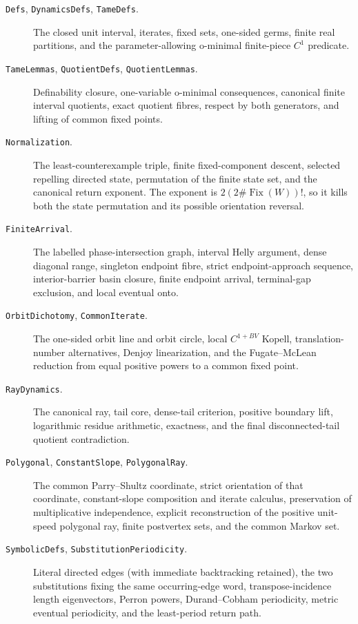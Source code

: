 \documentclass[11pt]{article}
\theoremstyle{definition}
\theoremstyle{remark}
\newcommand{\Fix}{\operatorname{Fix}}
\begin{document}
\begin{description}
\item[\texttt{Defs}, \texttt{DynamicsDefs}, \texttt{TameDefs}.]
The closed unit interval, iterates, fixed sets, one-sided germs, finite real
partitions, and the parameter-allowing o-minimal finite-piece \(C^1\)
predicate.

\item[\texttt{TameLemmas}, \texttt{QuotientDefs},
\texttt{QuotientLemmas}.]
Definability closure, one-variable o-minimal consequences, canonical finite
interval quotients, exact quotient fibres, respect by both generators, and
lifting of common fixed points.

\item[\texttt{Normalization}.]
The least-counterexample triple, finite fixed-component descent, selected
repelling directed state, permutation of the finite state set, and the
canonical return exponent.  The exponent is
\(2(2\#\Fix(W))!\), so it kills both the state permutation and its possible
orientation reversal.

\item[\texttt{FiniteArrival}.]
The labelled phase-intersection graph, interval Helly argument, dense
diagonal range, singleton endpoint fibre, strict endpoint-approach sequence,
interior-barrier basin closure, finite endpoint arrival, terminal-gap
exclusion, and local eventual onto.

\item[\texttt{OrbitDichotomy}, \texttt{CommonIterate}.]
The one-sided orbit line and orbit circle, local \(C^{1+BV}\) Kopell,
translation-number alternatives, Denjoy linearization, and the
Fugate--McLean reduction from equal positive powers to a common fixed point.

\item[\texttt{RayDynamics}.]
The canonical ray, tail core, dense-tail criterion, positive boundary lift,
logarithmic residue arithmetic, exactness, and the final disconnected-tail
quotient contradiction.

\item[\texttt{Polygonal}, \texttt{ConstantSlope},
\texttt{PolygonalRay}.]
The common Parry--Shultz coordinate, strict orientation of that coordinate,
constant-slope composition and iterate calculus, preservation of
multiplicative independence, explicit reconstruction of the positive
unit-speed polygonal ray, finite postvertex sets, and the common Markov set.

\item[\texttt{SymbolicDefs}, \texttt{SubstitutionPeriodicity}.]
Literal directed edges (with immediate backtracking retained), the two
substitutions fixing the same occurring-edge word, transpose-incidence length
eigenvectors, Perron powers, Durand--Cobham periodicity, metric eventual
periodicity, and the least-period return path.


\end{description}
\end{document}

